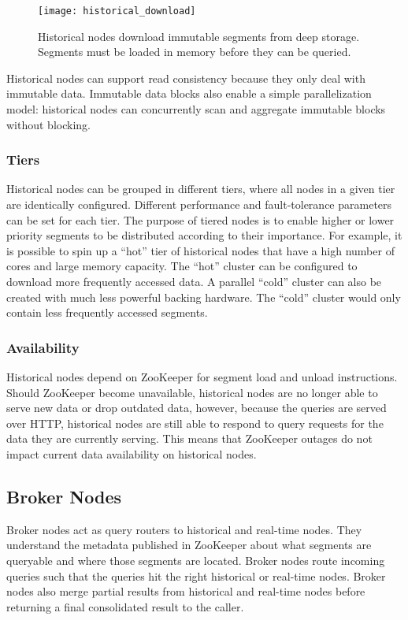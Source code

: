 \documentclass{sig-alternate-2013}
\begin{document}
\begin{figure}
\centering
\texttt{[image: historical\_download]}
\caption{Historical nodes download immutable segments from deep storage. Segments must be loaded in memory before they can be queried.}
\label{fig:historical_download}
\end{figure}

Historical nodes can support read consistency because they only deal with
immutable data. Immutable data blocks also enable a simple parallelization
model: historical nodes can concurrently scan and aggregate immutable blocks
without blocking.

\subsubsection{Tiers}
\label{sec:tiers}
Historical nodes can be grouped in different tiers, where all nodes in a
given tier are identically configured. Different performance and
fault-tolerance parameters can be set for each tier. The purpose of
tiered nodes is to enable higher or lower priority segments to be
distributed according to their importance. For example, it is possible
to spin up a “hot” tier of historical nodes that have a high number of
cores and large memory capacity. The “hot” cluster can be configured to
download more frequently accessed data. A parallel “cold” cluster
can also be created with much less powerful backing hardware. The
“cold” cluster would only contain less frequently accessed segments.

\subsubsection{Availability}
Historical nodes depend on ZooKeeper for segment load and unload instructions.
Should ZooKeeper become unavailable, historical nodes are no longer able to serve
new data or drop outdated data, however, because the queries are served over
HTTP, historical nodes are still able to respond to query requests for
the data they are currently serving. This means that ZooKeeper outages do not
impact current data availability on historical nodes.

\subsection{Broker Nodes}
Broker nodes act as query routers to historical and real-time nodes. They
understand the metadata published in ZooKeeper about what segments are
queryable and where those segments are located. Broker nodes route incoming queries
such that the queries hit the right historical or real-time nodes. Broker nodes
also merge partial results from historical and real-time nodes before returning
a final consolidated result to the caller.
\end{document}

